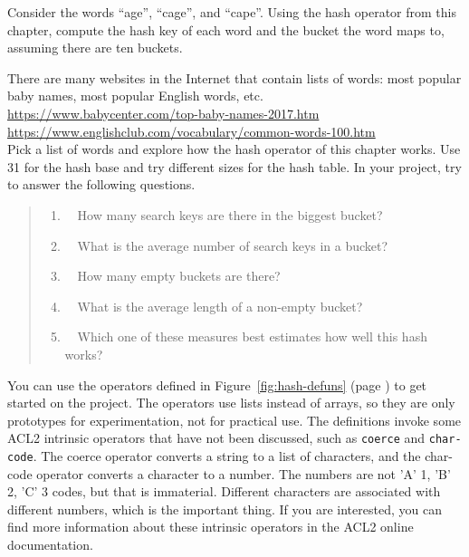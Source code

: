\begin{ExerciseList}
\Exercise Consider the words ``age'', ``cage'', and ``cape''.
Using the hash operator from this chapter, compute the hash key of each word
and the bucket the word maps to, assuming there are ten buckets.


\Exercise There are many websites in the Internet that contain lists of words:
most popular baby names, most popular English words, etc.\\
\hspace*{1cm}\url{https://www.babycenter.com/top-baby-names-2017.htm} \\
\hspace*{1cm}\url{https://www.englishclub.com/vocabulary/common-words-100.htm}\\
Pick a list of words and explore how the hash operator of this chapter works.
Use 31 for the hash base and try different sizes for the hash table.
In your project, try to answer the following questions.
\begin{quote}
\begin{enumerate}
\item ~~How many search keys are there in the biggest bucket?
\item ~~What is the average number of search keys in a bucket?
\item ~~How many empty buckets are there?
\item ~~What is the average length of a non-empty bucket?
\item ~~Which one of these measures best estimates how well this hash works?
\end{enumerate}
\end{quote}
You can use the operators defined in
Figure~\ref{fig:hash-defuns} (page \pageref{fig:hash-defuns})
to get started on the project.
The operators use lists instead of arrays, so they are only  prototypes
for experimentation, not for practical use.
The definitions invoke some ACL2 intrinsic operators
that have not been discussed, such as
\texttt{coerce} and \texttt{char-code}.
The coerce operator converts a string to a list of characters,
and the char-code operator converts a character to a number.
The numbers are not 'A' 1, 'B' 2, 'C' 3 codes, but that is immaterial.
Different characters are associated with different numbers,
which is the important thing. If you are interested,
you can find more information about these intrinsic
operators in the ACL2 online documentation.
\end{ExerciseList}

